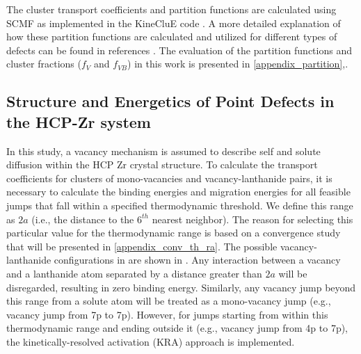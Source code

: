 \documentclass[preprint,12pt]{elsarticle}
\providecommand{\DIFadd}[1]{{\bf #1}} %
\providecommand{\DIFdel}[1]{} %
\providecommand{\DIFaddbegin}{\protect\color{blue}} %
\providecommand{\DIFaddend}{\protect\color{black}} %
\providecommand{\DIFdelbegin}{\protect\color{red}} %
\providecommand{\DIFdelend}{\protect\color{black}} %
\newcommand{\DIFscaledelfig}{0.5}
\newlength{\DIFdelgraphicswidth} %
\newlength{\DIFdelgraphicsheight} %
\newcommand{\DIFaddincludegraphics}[2][]{{\color{blue}\fbox{\DIFOincludegraphics[#1]{#2}}}} %
\newcommand{\DIFdelincludegraphics}[2][]{%
\sbox{\DIFdelgraphicsbox}{\DIFOincludegraphics[#1]{#2}}%
\settoboxwidth{\DIFdelgraphicswidth}{\DIFdelgraphicsbox} %
\settoboxtotalheight{\DIFdelgraphicsheight}{\DIFdelgraphicsbox} %
\scalebox{\DIFscaledelfig}{%
\parbox[b]{\DIFdelgraphicswidth}{\usebox{\DIFdelgraphicsbox}\\[-\baselineskip] \rule{\DIFdelgraphicswidth}{0em}}\llap{\resizebox{\DIFdelgraphicswidth}{\DIFdelgraphicsheight}{%
\setlength{\unitlength}{\DIFdelgraphicswidth}%
\begin{picture}(1,1)%
\thicklines\linethickness{2pt} %
{\color[rgb]{1,0,0}\put(0,0){\framebox(1,1){}}}%
{\color[rgb]{1,0,0}\put(0,0){\line( 1,1){1}}}%
{\color[rgb]{1,0,0}\put(0,1){\line(1,-1){1}}}%
\end{picture}%
}\hspace*{3pt}}} %
} %
\DeclareRobustCommand{\DIFaddbegin}{\DIFOaddbegin \let\includegraphics\DIFaddincludegraphics} %
\DeclareRobustCommand{\DIFaddend}{\DIFOaddend \let\includegraphics\DIFOincludegraphics} %
\DeclareRobustCommand{\DIFdelbegin}{\DIFOdelbegin \let\includegraphics\DIFdelincludegraphics} %
\DeclareRobustCommand{\DIFdelend}{\DIFOaddend \let\includegraphics\DIFOincludegraphics} %
\begin{document}
The cluster transport coefficients and partition functions are calculated using SCMF as implemented in the KineCluE code \cite{schuler_kineclue_2020}. A more detailed explanation of how these partition functions are calculated and utilized for different types of defects can be found in references \cite{messina_solute_2020, schuler_kineclue_2020}. 
The evaluation of the partition functions and cluster fractions ($f_V$ and $f_{VB}$) in this work is presented in \ref{appendix_partition},. 

\subsection{Structure and Energetics of Point Defects in the HCP-Zr system}

\FloatBarrier

In this study, a vacancy mechanism is assumed to describe self and solute diffusion within the HCP Zr crystal structure. To calculate the transport coefficients for clusters of mono-vacancies and vacancy-lanthanide pairs, it is necessary to calculate the binding energies and migration energies for all feasible jumps that fall within a specified thermodynamic threshold. We define this range as $2a$ (i.e., the distance to the $6^{th}$ nearest neighbor). The reason for selecting this particular value for the thermodynamic range is based on a convergence study that will be presented in \ref{appendix_conv_th_ra}. The possible vacancy-lanthanide configurations in \DIFdelbegin \DIFdel{HCP-Zr }\DIFdelend \DIFaddbegin \DIFadd{HCP Zr }\DIFaddend are shown in . Any interaction between a vacancy and a lanthanide atom separated by a distance greater than $2a$  will be disregarded, resulting in zero binding energy. Similarly, any vacancy jump beyond this range from a solute atom will be treated as a mono-vacancy jump (e.g., vacancy jump from 7p to 7p). However, for jumps starting from within this thermodynamic range and ending outside it (e.g., vacancy jump from 4p to 7p), the kinetically-resolved activation (KRA) approach \cite{van_der_ven_first_2005} is implemented. 
\end{document}
